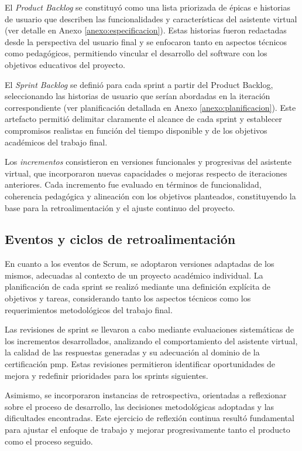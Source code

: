 El \textit{Product Backlog} se constituyó como una lista priorizada de épicas e historias de usuario que describen las funcionalidades y características del asistente virtual (ver detalle en Anexo \ref{anexo:especificacion}). Estas historias fueron redactadas desde la perspectiva del usuario final y se enfocaron tanto en aspectos técnicos como pedagógicos, permitiendo vincular el desarrollo del software con los objetivos educativos del proyecto.

El \textit{Sprint Backlog} se definió para cada sprint a partir del Product Backlog, seleccionando las historias de usuario que serían abordadas en la iteración correspondiente (ver planificación detallada en Anexo \ref{anexo:planificacion}). Este artefacto permitió delimitar claramente el alcance de cada sprint y establecer compromisos realistas en función del tiempo disponible y de los objetivos académicos del trabajo final.

Los \textit{incrementos} consistieron en versiones funcionales y progresivas del asistente virtual, que incorporaron nuevas capacidades o mejoras respecto de iteraciones anteriores. Cada incremento fue evaluado en términos de funcionalidad, coherencia pedagógica y alineación con los objetivos planteados, constituyendo la base para la retroalimentación y el ajuste continuo del proyecto.

\subsection{Eventos y ciclos de retroalimentación}

En cuanto a los eventos de Scrum, se adoptaron versiones adaptadas de los mismos, adecuadas al contexto de un proyecto académico individual. La planificación de cada sprint se realizó mediante una definición explícita de objetivos y tareas, considerando tanto los aspectos técnicos como los requerimientos metodológicos del trabajo final.

Las revisiones de sprint se llevaron a cabo mediante evaluaciones sistemáticas de los incrementos desarrollados, analizando el comportamiento del asistente virtual, la calidad de las respuestas generadas y su adecuación al dominio de la certificación \gls{pmp}. Estas revisiones permitieron identificar oportunidades de mejora y redefinir prioridades para los sprints siguientes.

Asimismo, se incorporaron instancias de retrospectiva, orientadas a reflexionar sobre el proceso de desarrollo, las decisiones metodológicas adoptadas y las dificultades encontradas. Este ejercicio de reflexión continua resultó fundamental para ajustar el enfoque de trabajo y mejorar progresivamente tanto el producto como el proceso seguido.

